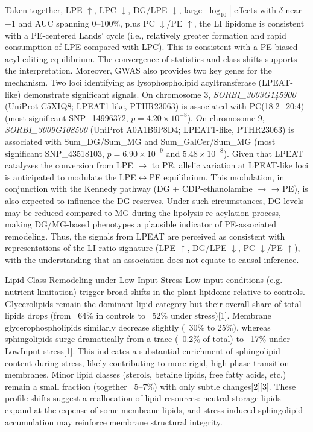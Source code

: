 \documentclass[10pt,letterpaper]{article}
\begin{document}
\begin{itemize}
Taken together, LPE $\uparrow$, LPC $\downarrow$, DG/LPE $\downarrow$, large $|\log_{10}|$ effects with $\delta$ near $\pm 1$ and AUC spanning 0–100\%, plus PC $\downarrow$/PE $\uparrow$, the LI lipidome is consistent with a PE-centered Lands’ cycle (i.e., relatively greater formation and rapid consumption of LPE compared with LPC). This is consistent with a PE-biased acyl-editing equilibrium. The convergence of statistics and class shifts supports the interpretation. Moreover, GWAS also provides two key genes for the mechanism. Two loci identifying as lysophospholipid acyltransferase (LPEAT-like) demonstrate significant signals. On chromosome 3, \textit{SORBI\_3003G145900} (UniProt C5XIQ8; LPEAT1-like, PTHR23063) is associated with PC(18:2\_20:4) (most significant SNP\_14996372, $p = 4.20 \times 10^{-8}$). On chromosome 9, \textit{SORBI\_3009G108500} (UniProt A0A1B6P8D4; LPEAT1-like, PTHR23063) is associated with Sum\_DG/Sum\_MG and Sum\_GalCer/Sum\_MG (most significant SNP\_43518103, $p = 6.90 \times 10^{-9}$ and $5.48 \times 10^{-8}$). Given that LPEAT catalyzes the conversion from LPE $\rightarrow$ to PE, allelic variation at LPEAT-like loci is anticipated to modulate the LPE$\leftrightarrow$PE equilibrium. This modulation, in conjunction with the Kennedy pathway (DG + CDP-ethanolamine $\rightarrow$ → PE), is also expected to influence the DG reserves. Under such circumstances, DG levels may be reduced compared to MG during the lipolysis-re-acylation process, making DG/MG-based phenotypes a plausible indicator of PE-associated remodeling. Thus, the signals from LPEAT are perceived as consistent with representations of the LI ratio signature (LPE $\uparrow$, DG/LPE $\downarrow$, PC $\downarrow$/PE $\uparrow$), with the understanding that an association does not equate to causal inference.




Lipid Class Remodeling under Low-Input Stress
Low-input conditions (e.g. nutrient limitation) trigger broad shifts in the plant lipidome relative to controls. Glycerolipids remain the dominant lipid category but their overall share of total lipids drops (from ~64\% in controls to ~52\% under stress)[1]. Membrane glycerophospholipids similarly decrease slightly (~30\% to 25\%), whereas sphingolipids surge dramatically from a trace (~0.2\% of total) to ~17\% under LowInput stress[1]. This indicates a substantial enrichment of sphingolipid content during stress, likely contributing to more rigid, high-phase-transition membranes. Minor lipid classes (sterols, betaine lipids, free fatty acids, etc.) remain a small fraction (together ~5–7\%) with only subtle changes[2][3]. These profile shifts suggest a reallocation of lipid resources: neutral storage lipids expand at the expense of some membrane lipids, and stress-induced sphingolipid accumulation may reinforce membrane structural integrity.


\end{itemize}
\end{document}

